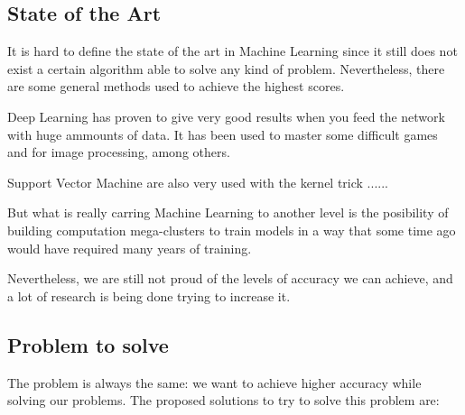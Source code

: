 \documentclass{article}
\begin{document}
    \subsection{State of the Art}

    It is hard to define the state of the art in Machine Learning since it still
    does not exist a certain algorithm able to solve any kind of problem.
    Nevertheless, there are some general methods used to achieve the highest
    scores.

    Deep Learning has proven to give very good results when you feed the network
    with huge ammounts of data. It has been used to master some difficult games
    and for image processing, among others.

    Support Vector Machine are also very used with the kernel trick ......

    But what is really carring Machine Learning to another level is the posibility
    of building computation mega-clusters to train models in a way that some time
    ago would have required many years of training.

    Nevertheless, we are still not proud of the levels of accuracy we can achieve,
    and a lot of research is being done trying to increase it.

    \subsection{Problem to solve}
    The problem is always the same: we want to achieve higher accuracy while
    solving our problems. The proposed solutions to try to solve this problem
    are:
\end{document}
